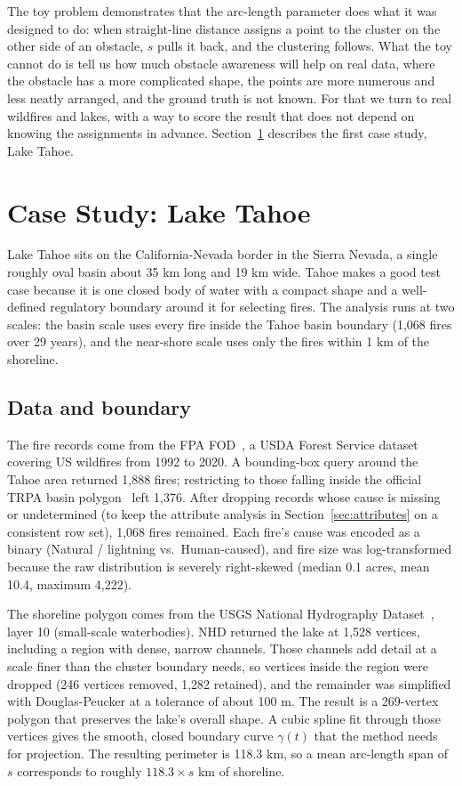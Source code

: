 \documentclass[11pt]{article}
\begin{document}
The toy problem demonstrates that the arc-length parameter does what it was designed to do: when straight-line distance assigns a point to the cluster on the other side of an obstacle, $s$ pulls it back, and the clustering follows. What the toy cannot do is tell us how much obstacle awareness will help on real data, where the obstacle has a more complicated shape, the points are more numerous and less neatly arranged, and the ground truth is not known. For that we turn to real wildfires and lakes, with a way to score the result that does not depend on knowing the assignments in advance. Section~\ref{sec:tahoe} describes the first case study, Lake Tahoe.

\section{Case Study: Lake Tahoe}
\label{sec:tahoe}
 
Lake Tahoe sits on the California-Nevada border in the Sierra Nevada, a single roughly oval basin about 35 km long and 19 km wide. Tahoe makes a good test case because it is one closed body of water with a compact shape and a well-defined regulatory boundary around it for selecting fires. The analysis runs at two scales: the basin scale uses every fire inside the Tahoe basin boundary (1,068 fires over 29 years), and the near-shore scale uses only the fires within 1 km of the shoreline.

\subsection{Data and boundary}
 
The fire records come from the FPA FOD~\cite{fpafod}, a USDA Forest Service dataset covering US wildfires from 1992 to 2020. A bounding-box query around the Tahoe area returned 1,888 fires; restricting to those falling inside the official TRPA basin polygon~\cite{trpa} left 1,376. After dropping records whose cause is missing or undetermined (to keep the attribute analysis in Section~\ref{sec:attributes} on a consistent row set), 1,068 fires remained. Each fire's cause was encoded as a binary (Natural / lightning vs.\ Human-caused), and fire size was log-transformed because the raw distribution is severely right-skewed (median 0.1 acres, mean 10.4, maximum 4,222).
 
The shoreline polygon comes from the USGS National Hydrography Dataset~\cite{nhd}, layer 10 (small-scale waterbodies). NHD returned the lake at 1,528 vertices, including a region with dense, narrow channels. Those channels add detail at a scale finer than the cluster boundary needs, so vertices inside the region were dropped (246 vertices removed, 1,282 retained), and the remainder was simplified with Douglas-Peucker at a tolerance of about 100 m. The result is a 269-vertex polygon that preserves the lake's overall shape. A cubic spline fit through those vertices gives the smooth, closed boundary curve $\gamma(t)$ that the method needs for projection. The resulting perimeter is 118.3 km, so a mean arc-length span of $s$ corresponds to roughly $118.3 \times s$ km of shoreline.
 
\end{document}
